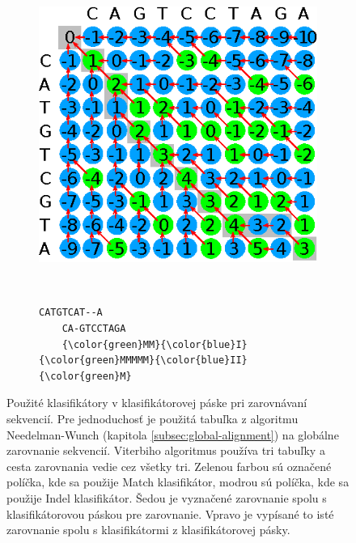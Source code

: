 \begin{figure}[htp]
    \centering
    \begin{subfigure}[m]{0.5\textwidth}
    \centering
    \includegraphics[width=\textwidth]{images/clf_tape}
    \end{subfigure}
    ~
    \begin{subfigure}[m]{0.3\textwidth}
    \centering
    \begin{BVerbatim}[commandchars=\\\{\}]
    CATGTCAT--A
    CA-GTCCTAGA
    {\color{green}MM}{\color{blue}I}{\color{green}MMMMM}{\color{blue}II}{\color{green}M}
    \end{BVerbatim}
    \end{subfigure}
    \caption[Použité klasifikátory v klasifikátorovej páske]{Použité klasifikátory v klasifikátorovej páske pri zarovnávaní sekvencií. Pre jednoduchosť je použitá tabuľka z algoritmu Needelman-Wunch (kapitola \ref{subsec:global-alignment}) na globálne zarovnanie sekvencií. Viterbiho algoritmus používa tri tabuľky a cesta zarovnania vedie cez všetky tri. Zelenou farbou sú označené políčka, kde sa použije Match klasifikátor, modrou sú políčka, kde sa použije Indel klasifikátor. Šedou je vyznačené zarovnanie spolu s klasifikátorovou páskou pre zarovnanie. Vpravo je vypísané to isté zarovnanie spolu s klasifikátormi z klasifikátorovej pásky.}
    \label{fig:clf-tape}
\end{figure}

